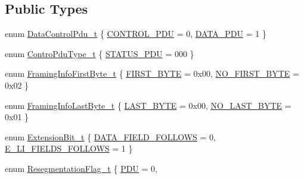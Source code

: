 \subsection*{Public Types}
\begin{DoxyCompactItemize}
\item 
enum \hyperlink{classns3_1_1LteRlcAmHeader_a7ccc7b1df0021a5e891e02380cd82cd6}{Data\+Control\+Pdu\+\_\+t} \{ \hyperlink{classns3_1_1LteRlcAmHeader_a7ccc7b1df0021a5e891e02380cd82cd6aa624cc11eeb1a0c898a9483a78010794}{C\+O\+N\+T\+R\+O\+L\+\_\+\+P\+DU} = 0, 
\hyperlink{classns3_1_1LteRlcAmHeader_a7ccc7b1df0021a5e891e02380cd82cd6a42c82aab6e185dae47e6abd252fe75d2}{D\+A\+T\+A\+\_\+\+P\+DU} = 1
 \}
\item 
enum \hyperlink{classns3_1_1LteRlcAmHeader_a91ebd7f63ef09e33d7755c660add464e}{Contro\+Pdu\+Type\+\_\+t} \{ \hyperlink{classns3_1_1LteRlcAmHeader_a91ebd7f63ef09e33d7755c660add464ea2d662e6a06cefca8c790c83cc2f5ed95}{S\+T\+A\+T\+U\+S\+\_\+\+P\+DU} = 000
 \}
\item 
enum \hyperlink{classns3_1_1LteRlcAmHeader_af42d22f1202bd0d8fa1f4cd0494b8b29}{Framing\+Info\+First\+Byte\+\_\+t} \{ \hyperlink{classns3_1_1LteRlcAmHeader_af42d22f1202bd0d8fa1f4cd0494b8b29a3b7a1fc289b74db76f2e76194d289a24}{F\+I\+R\+S\+T\+\_\+\+B\+Y\+TE} = 0x00, 
\hyperlink{classns3_1_1LteRlcAmHeader_af42d22f1202bd0d8fa1f4cd0494b8b29a32b741f4f0b7c331632c185341ac9cb4}{N\+O\+\_\+\+F\+I\+R\+S\+T\+\_\+\+B\+Y\+TE} = 0x02
 \}
\item 
enum \hyperlink{classns3_1_1LteRlcAmHeader_af0fb4ccf208128c7cf9dcabf02593749}{Framing\+Info\+Last\+Byte\+\_\+t} \{ \hyperlink{classns3_1_1LteRlcAmHeader_af0fb4ccf208128c7cf9dcabf02593749afae5968023949559fdf8d8ad9feb81cd}{L\+A\+S\+T\+\_\+\+B\+Y\+TE} = 0x00, 
\hyperlink{classns3_1_1LteRlcAmHeader_af0fb4ccf208128c7cf9dcabf02593749af3f3cbb1727324b59b486aa955ce28f8}{N\+O\+\_\+\+L\+A\+S\+T\+\_\+\+B\+Y\+TE} = 0x01
 \}
\item 
enum \hyperlink{classns3_1_1LteRlcAmHeader_a516bc34a521085f22b455aeac9ebc364}{Extension\+Bit\+\_\+t} \{ \hyperlink{classns3_1_1LteRlcAmHeader_a516bc34a521085f22b455aeac9ebc364ad70b61eeac2e18a01f13b8f94530ba1f}{D\+A\+T\+A\+\_\+\+F\+I\+E\+L\+D\+\_\+\+F\+O\+L\+L\+O\+WS} = 0, 
\hyperlink{classns3_1_1LteRlcAmHeader_a516bc34a521085f22b455aeac9ebc364aef53e53d29f464e8cb34fd6fede4b18c}{E\+\_\+\+L\+I\+\_\+\+F\+I\+E\+L\+D\+S\+\_\+\+F\+O\+L\+L\+O\+WS} = 1
 \}
\item 
enum \hyperlink{classns3_1_1LteRlcAmHeader_aa7a03eaac5875a18c2f95d3a0091d138}{Resegmentation\+Flag\+\_\+t} \{ \hyperlink{classns3_1_1LteRlcAmHeader_aa7a03eaac5875a18c2f95d3a0091d138a6f96f786048a3d5e5189aba4e21f5d22}{P\+DU} = 0, 

\end{DoxyCompactItemize}
